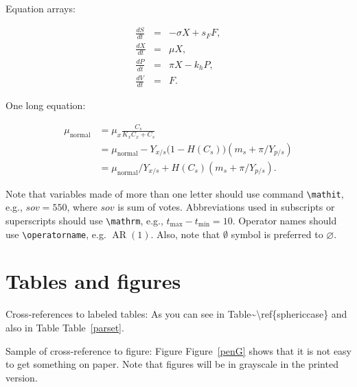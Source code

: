 \documentclass[qe,nameyear,draft]{econsocart}
\theoremstyle{plain}
\theoremstyle{remark}
\begin{document}
Equation arrays:

\begin{align}
  \frac{dS}{dt} & = & - \sigma X + s_{F} F,\\
  \frac{dX}{dt} & = &   \mu    X,\\
  \frac{dP}{dt} & = &   \pi    X - k_{h} P,\\
  \frac{dV}{dt} & = &   F.
\end{align}

One long equation:

\begin{align}
 \mu_{\text{normal}} & = \mu_{x} \frac{C_{s}}{K_{x}C_{x}+C_{s}}  \nonumber\\
                     & = \mu_{\text{normal}} - Y_{x/s}\bigl(1-H(C_{s})\bigr)(m_{s}+\pi /Y_{p/s})\nonumber\\
                     & = \mu_{\text{normal}}/Y_{x/s}+ H(C_{s}) (m_{s}+ \pi /Y_{p/s}).
\end{align}

Note that variables made of more than one letter should use command \texttt{{\textbackslash}mathit},
e.g., $\mathit{sov}=550$, where $\mathit{sov}$ is sum of votes. Abbreviations used in subscripts or superscripts should use \texttt{{\textbackslash}mathrm},
e.g., $t_{\mathrm{max}} -t_{\mathrm{min}} =10$. Operator names should use \texttt{{\textbackslash}operatorname}, e.g. $\operatorname{AR}(1)$. Also, note that $\emptyset$ symbol is preferred to $\varnothing$.

\section{Tables and figures}

Cross-references to labeled tables: As you can see in Table{\textasciitilde}{\textbackslash}ref\{sphericcase\}
and also in Table Table~\ref{parset}.

Sample of cross-reference to figure: Figure Figure~\ref{penG} shows that it is not easy to get something on paper. Note that figures will be in grayscale in the printed version.
\end{document}
